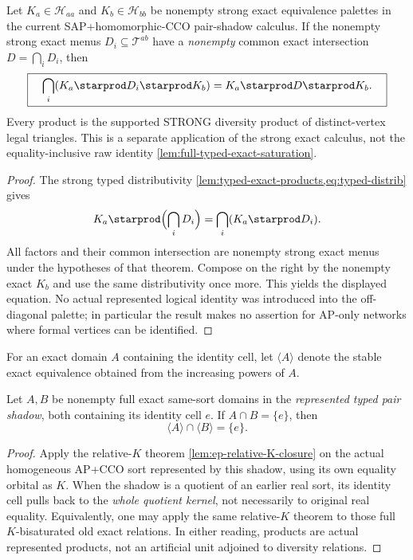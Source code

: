 \begin{lemma}
\label{lem:exact-saturation-intersection}
Let $K_a\in\mathcal H_{aa}$ and $K_b\in\mathcal H_{bb}$
be nonempty strong exact equivalence palettes in the
current SAP+homomorphic-CCO pair-shadow calculus.
If the nonempty strong exact menus
$D_i\subseteq\mathcal T^{ab}$ have a
\emph{nonempty} common exact intersection
$D=\bigcap_iD_i$, then
\[
 \boxed{\quad
 \bigcap_i(K_a\starprod D_i\starprod K_b)
     =K_a\starprod D\starprod K_b .
 \quad}
\]
Every product is the supported STRONG diversity product
of distinct-vertex legal triangles. This is a separate
application of the strong exact calculus, not the
equality-inclusive raw identity
\cref{lem:full-typed-exact-saturation}.
\end{lemma}
\begin{proof}
The strong typed distributivity
\cref{lem:typed-exact-products,eq:typed-distrib}
gives
\[
 K_a\starprod\Bigl(\bigcap_iD_i\Bigr)
       =\bigcap_i(K_a\starprod D_i).
\]
All factors and their common intersection
are nonempty strong exact menus under the
hypotheses of that theorem. Compose on the
right by the nonempty exact $K_b$ and use the
same distributivity once more. This yields
the displayed equation. No actual represented
logical identity was introduced into the
off-diagonal palette; in particular the result
makes no assertion for AP-only networks where
formal vertices can be identified.
\end{proof}

For an exact domain $A$ containing the identity cell, let
$\langle A\rangle$ denote the stable exact equivalence obtained from the
increasing powers of $A$.

\begin{theorem}
\label{thm:closure-separation}
Let $A,B$ be nonempty full exact same-sort domains in the
\emph{represented typed pair shadow}, both containing its identity
cell $e$. If $A\cap B=\{e\}$, then
\[
 \langle A\rangle\cap\langle B\rangle=\{e\}.
\]
\end{theorem}
\begin{proof}
Apply the relative-$K$ theorem
\cref{lem:ep-relative-K-closure} on the actual homogeneous
AP+CCO sort represented by this shadow, using its own equality
orbital as $K$. When the shadow is a quotient of an earlier real
sort, its identity cell pulls back to the \emph{whole quotient
kernel}, not necessarily to original real equality. Equivalently,
one may apply the same relative-$K$ theorem to those full
$K$-bisaturated old exact relations. In either reading, products
are actual represented products, not an artificial unit adjoined
to diversity relations.
\end{proof}


